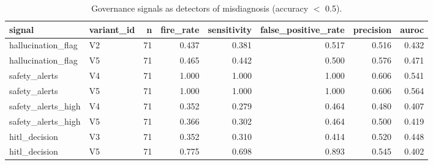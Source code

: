\begin{table}[t]
\centering
\small
\begin{tabular}{llrrrrrr}
\toprule
signal & variant\_id & n & fire\_rate & sensitivity & false\_positive\_rate & precision & auroc \\
\midrule
hallucination\_flag & V2 & 71 & 0.437 & 0.381 & 0.517 & 0.516 & 0.432 \\
hallucination\_flag & V5 & 71 & 0.465 & 0.442 & 0.500 & 0.576 & 0.471 \\
safety\_alerts & V4 & 71 & 1.000 & 1.000 & 1.000 & 0.606 & 0.541 \\
safety\_alerts & V5 & 71 & 1.000 & 1.000 & 1.000 & 0.606 & 0.564 \\
safety\_alerts\_high & V4 & 71 & 0.352 & 0.279 & 0.464 & 0.480 & 0.407 \\
safety\_alerts\_high & V5 & 71 & 0.366 & 0.302 & 0.464 & 0.500 & 0.419 \\
hitl\_decision & V3 & 71 & 0.352 & 0.310 & 0.414 & 0.520 & 0.448 \\
hitl\_decision & V5 & 71 & 0.775 & 0.698 & 0.893 & 0.545 & 0.402 \\
\bottomrule
\end{tabular}
\caption{Governance signals as detectors of misdiagnosis (accuracy $<$ 0.5).}
\label{tab:rigor_alert_discrimination}
\end{table}
